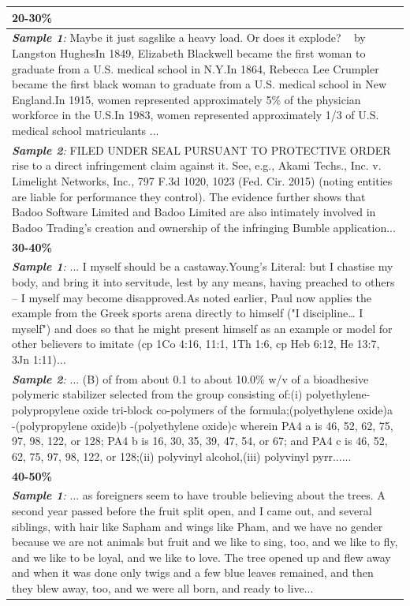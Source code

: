 \documentclass[11pt]{article}
\begin{document}
\begin{longtable}{p{15cm}}
\midrule
\small \textbf{20-30\%} \\
\midrule
\small \textit{\textbf{Sample 1}:} Maybe it just sagslike a heavy load. Or does it explode? ~ by Langston HughesIn 1849, Elizabeth Blackwell became the first woman to graduate from a U.S. medical school in N.Y.In 1864, Rebecca Lee Crumpler became the first black woman to graduate from a U.S. medical school in New England.In 1915, women represented approximately 5\% of the physician workforce in the U.S.In 1983, women represented approximately 1/3 of U.S. medical school matriculants ... \\
\small \textit{\textbf{Sample 2}:} FILED UNDER SEAL PURSUANT TO PROTECTIVE ORDER rise to a direct infringement claim against it. See, e.g., Akami Techs., Inc. v. Limelight Networks, Inc., 797 F.3d 1020, 1023 (Fed. Cir. 2015) (noting entities are liable for performance they control). The evidence further shows that Badoo Software Limited and Badoo Limited are also intimately involved in Badoo Trading's creation and ownership of the infringing Bumble application... \\
\midrule
\small \textbf{30-40\%} \\
\midrule
\small \textit{\textbf{Sample 1}:} ... I myself should be a castaway.Young's Literal: but I chastise my body, and bring it into servitude, lest by any means, having preached to others -- I myself may become disapproved.As noted earlier, Paul now applies the example from the Greek sports arena directly to himself ("I discipline… I myself") and does so that he might present himself as an example or model for other believers to imitate (cp 1Co 4:16, 11:1, 1Th 1:6, cp Heb 6:12, He 13:7, 3Jn 1:11)...  \\
\small \textit{\textbf{Sample 2}:}  ... (B) of from about 0.1 to about 10.0\% w/v of a bioadhesive polymeric stabilizer selected from the group consisting of:(i) polyethylene-polypropylene oxide tri-block co-polymers of the formula;(polyethylene oxide)a -(polypropylene oxide)b -(polyethylene oxide)c wherein PA4 a is 46, 52, 62, 75, 97, 98, 122, or 128; PA4 b is 16, 30, 35, 39, 47, 54, or 67; and PA4 c is 46, 52, 62, 75, 97, 98, 122, or 128;(ii) polyvinyl alcohol,(iii) polyvinyl pyrr......\\
\midrule
\small \textbf{40-50\%} \\
\midrule
\small \textit{\textbf{Sample 1}:}  ... as foreigners seem to have trouble believing about the trees. A second year passed before the fruit split open, and I came out, and several siblings, with hair like Sapham and wings like Pham, and we have no gender because we are not animals but fruit and we like to sing, too, and we like to fly, and we like to be loyal, and we like to love. The tree opened up and flew away and when it was done only twigs and a few blue leaves remained, and then they blew away, too, and we were all born, and ready to live... \\

\end{longtable}
\end{document}
